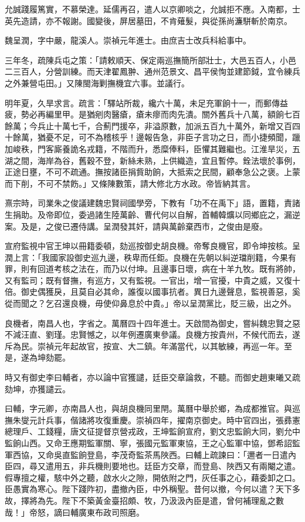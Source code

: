 \begin{pinyinscope}
允誠踐履篤實，不慕榮達。延儒再召，遣人以京卿啖之，允誠拒不應。入南都，士英先造請，亦不報謝。國變後，屏居墓田，不肯薙髮，與從孫尚濂駢斬於南京。

魏呈潤，字中嚴，龍溪人。崇禎元年進士。由庶吉士改兵科給事中。

三年冬，疏陳兵屯之策：「請敕順天、保定兩巡撫簡所部壯士，大邑五百人，小邑二三百人，分營訓練。而天津翟鳳翀、通州范景文、昌平侯恂並建節鉞，宜令練兵之外兼營屯田。」又陳閩海剿撫機宜六事。並議行。

明年夏，久旱求言。疏言：「驛站所裁，纔六十萬，未足充軍餉十一，而郵傳益疲，勢必再編里甲。是猶剜肉醫瘡，瘡未瘳而肉先潰。關外舊兵十八萬，額餉七百餘萬；今兵止十萬七千，合薊門援卒，非溢原數，加派五百九十萬外，新增又百四十餘萬，猶憂不足，可不為稽核乎！邊報告急，非臣子言功之日，而小捷頻聞，躐加峻秩，門客廝養詭名戎籍，不階而升，悉糜俸料，臣懼其難繼也。江淮旱災，五湖之間，海岸為谷，舊穀不登，新絲未熟，上供織造，宜且暫停。銓法壞於事例，正途日壅，不可不疏通。撫按諸臣捐貲助餉，大抵索之民間，顧奉急公之褒。上蒙而下削，不可不禁飭。」又條陳數策，請大修北方水政。帝皆納其言。

熹宗時，司業朱之俊議建魏忠賢祠國學旁，下教有「功不在禹下」語，置籍，責諸生捐助。及帝即位，委過諸生陸萬齡、曹代何以自解，首輔韓爌以同鄉庇之，漏逆案。及是，之俊已遷侍講。呈潤發其奸，請與萬齡棄西市，之俊由是廢。

宣府監視中官王坤以冊籍委頓，劾巡按御史胡良機。帝奪良機官，即令坤按核。呈潤上言：「我國家設御史巡九邊，秩卑而任鉅。良機在先朝以糾逆璫削籍，今果有罪，則有回道考核之法在，而乃以付坤。且邊事日壞，病在十羊九牧。既有將帥，又有監司；既有督撫，有巡方，又有監視。一官出，增一官擾，中貴之威，又復十倍。御史偶獲戾，且莫自必其命，誰復以國事抗者。異日九邊聲息，監視善惡，奚從而聞之？乞召還良機，毋使仰鼻息於中貴。」帝以呈潤黨比，貶三級，出之外。

良機者，南昌人也，字省之。萬曆四十四年進士。天啟間為御史，嘗糾魏忠賢之惡不減汪直、劉瑾。忠賢憾之，以年例遷廣東參議。良機方按貴州，不候代而去，遂斥為民。崇禎元年起故官，按宣、大二鎮。年滿當代，以其敏練，再巡一年。至是，遂為坤劾罷。

時又有御史李曰輔者，亦以論中官獲譴，廷臣交章論救，不聽。而御史趙東曦又疏劾坤，亦獲譴云。

曰輔，字元卿，亦南昌人也，與胡良機同里閈。萬曆中舉於鄉，為成都推官。與巡撫朱燮元計兵事，偕諸將攻復重慶。崇禎四年，擢南京御史。時中官四出，張彞憲總理戶、工錢糧，唐文征提督京營戎政，王坤監餉宣府，劉文忠監餉大同，劉允中監餉山西。又命王應期監軍關、寧，張國元監軍東協，王之心監軍中協，鄧希詔監軍西協，又命吳直監餉登島，李茂奇監茶馬陜西。曰輔上疏諫曰：「邇者一日遣內臣四，尋又遣用五，非兵機則要地也。廷臣方交章，而登島、陜西又有兩閹之遣。假專擅之權，駭中外之聽，啟水火之隙，開依附之門，灰任事之心，藉委卸之口。臣愚實為寒心。陛下踐阼初，盡撤內臣，中外稱聖。昔何以撤，今何以遣？天下多故，擇將為先。陛下不築黃金臺招頗、牧，乃汲汲內臣是遣，曾何補理亂之數哉！」帝怒，謫曰輔廣東布政司照磨。


\end{pinyinscope}
